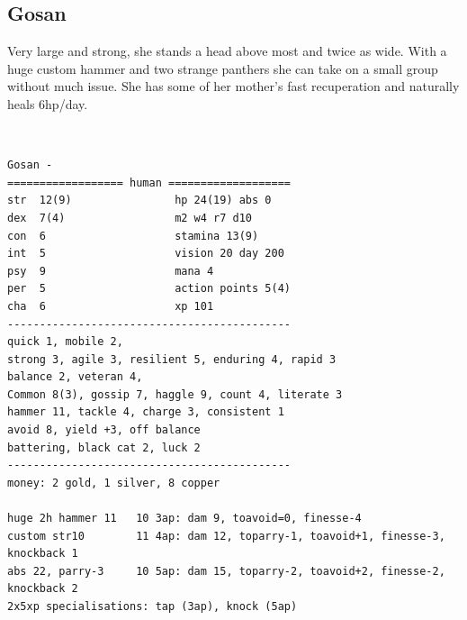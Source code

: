 \clearpage
\begin{samepage}
\subsection*{Gosan}
Very large and strong, she stands a head above most and twice as wide. With a huge custom hammer and two strange panthers she can take on a small group without much issue. She has some of her mother's fast recuperation and naturally heals 6hp/day.

\

\small \begin{verbatim}
Gosan -
================== human ===================
str  12(9)                hp 24(19) abs 0
dex  7(4)                 m2 w4 r7 d10
con  6                    stamina 13(9)
int  5                    vision 20 day 200
psy  9                    mana 4
per  5                    action points 5(4)
cha  6                    xp 101
--------------------------------------------
quick 1, mobile 2,
strong 3, agile 3, resilient 5, enduring 4, rapid 3
balance 2, veteran 4,
Common 8(3), gossip 7, haggle 9, count 4, literate 3
hammer 11, tackle 4, charge 3, consistent 1
avoid 8, yield +3, off balance
battering, black cat 2, luck 2
--------------------------------------------
money: 2 gold, 1 silver, 8 copper

huge 2h hammer 11   10 3ap: dam 9, toavoid=0, finesse-4
custom str10        11 4ap: dam 12, toparry-1, toavoid+1, finesse-3, knockback 1
abs 22, parry-3     10 5ap: dam 15, toparry-2, toavoid+2, finesse-2, knockback 2
2x5xp specialisations: tap (3ap), knock (5ap)
\end{verbatim} \normalsize
\end{samepage}


